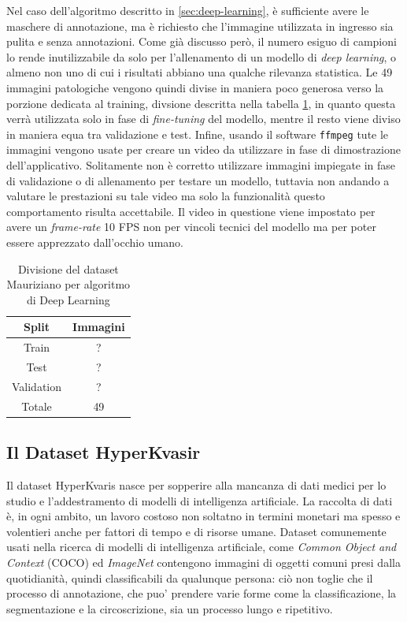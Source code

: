 Nel caso dell'algoritmo descritto in \ref{sec:deep-learning},
è sufficiente avere le maschere di annotazione, ma è richiesto
che l'immagine utilizzata in ingresso sia pulita e senza annotazioni.
Come già discusso però, il numero esiguo di campioni lo rende
inutilizzabile da solo per l'allenamento di un modello di
{\it deep learning}, o almeno non uno di cui i risultati abbiano
una qualche rilevanza statistica.
Le 49 immagini patologiche vengono quindi divise in maniera poco
generosa verso la porzione dedicata al training, divsione
descritta nella tabella \ref{tab:mauriziano-ii}, in quanto questa
verrà utilizzata solo in fase di {\it fine-tuning} del modello,
mentre il resto viene diviso in maniera equa tra validazione e test.
Infine, usando il software {\tt ffmpeg} tute le immagini vengono
usate per creare un video da utilizzare in fase di dimostrazione
dell'applicativo.
Solitamente non è corretto utilizzare immagini impiegate in fase
di validazione o di allenamento per testare un modello,
tuttavia non andando a valutare le prestazioni su tale video
ma solo la funzionalità questo comportamento risulta accettabile.
Il video in questione viene impostato per avere un {\it frame-rate}
10 FPS non per vincoli tecnici del modello ma per poter
essere apprezzato dall'occhio umano.

\begin{table}
    \center
    \begin{tabular}[h]{||c|c||}
        \hline
        Split & Immagini \\
        \hline
        Train & ? \\
        Test & ? \\
        Validation & ? \\
        \hline
        Totale & 49 \\
        \hline
    \end{tabular}
    \caption{\label{tab:mauriziano-ii}Divisione del dataset Mauriziano per
    algoritmo di Deep Learning}
\end{table}



\subsection{\label{sec:dataset-hyperkvasir}Il Dataset HyperKvasir}

Il dataset HyperKvaris\cite{HyperKvasirDataset} nasce per sopperire
alla mancanza di dati medici per lo studio e l'addestramento
di modelli di intelligenza artificiale.
La raccolta di dati è, in ogni ambito, un lavoro costoso non 
soltatno in termini monetari ma spesso e volentieri anche
per fattori di tempo e di risorse umane.
Dataset comunemente usati nella ricerca di modelli di intelligenza
artificiale, come {\it Common Object and Context}\cite{cocodataset}
(COCO) ed {\it ImageNet} \cite{imagenet} contengono
immagini di oggetti comuni presi dalla quotidianità,
quindi classificabili da qualunque persona: ciò non toglie
che il processo di annotazione, che puo' prendere
varie forme come la classificazione, la segmentazione e la
circoscrizione, sia un processo lungo e ripetitivo.

